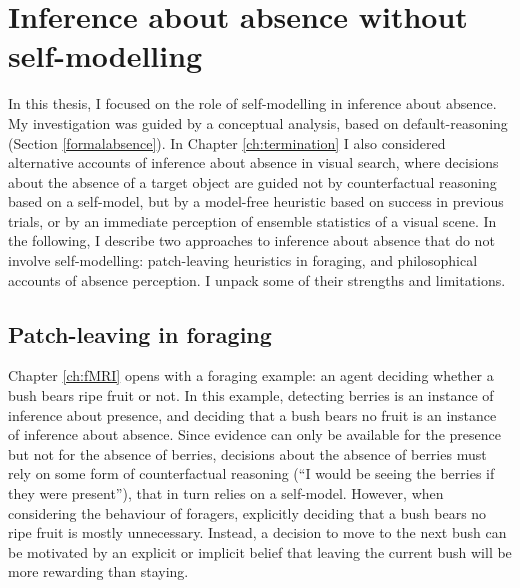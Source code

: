 \documentclass[12pt,twoside]{reedthesis}
\begin{document}
\hypertarget{withoutselfmodel}{%
\section*{Inference about absence without self-modelling}\label{withoutselfmodel}}

In this thesis, I focused on the role of self-modelling in inference about absence. My investigation was guided by a conceptual analysis, based on default-reasoning (Section \ref{formalabsence}). In Chapter \ref{ch:termination} I also considered alternative accounts of inference about absence in visual search, where decisions about the absence of a target object are guided not by counterfactual reasoning based on a self-model, but by a model-free heuristic based on success in previous trials, or by an immediate perception of ensemble statistics of a visual scene. In the following, I describe two approaches to inference about absence that do not involve self-modelling: patch-leaving heuristics in foraging, and philosophical accounts of absence perception. I unpack some of their strengths and limitations.

\hypertarget{patch}{%
\subsection*{Patch-leaving in foraging}\label{patch}}

Chapter \ref{ch:fMRI} opens with a foraging example: an agent deciding whether a bush bears ripe fruit or not. In this example, detecting berries is an instance of inference about presence, and deciding that a bush bears no fruit is an instance of inference about absence. Since evidence can only be available for the presence but not for the absence of berries, decisions about the absence of berries must rely on some form of counterfactual reasoning (``I would be seeing the berries if they were present''), that in turn relies on a self-model. However, when considering the behaviour of foragers, explicitly deciding that a bush bears no ripe fruit is mostly unnecessary. Instead, a decision to move to the next bush can be motivated by an explicit or implicit belief that leaving the current bush will be more rewarding than staying.
\end{document}
